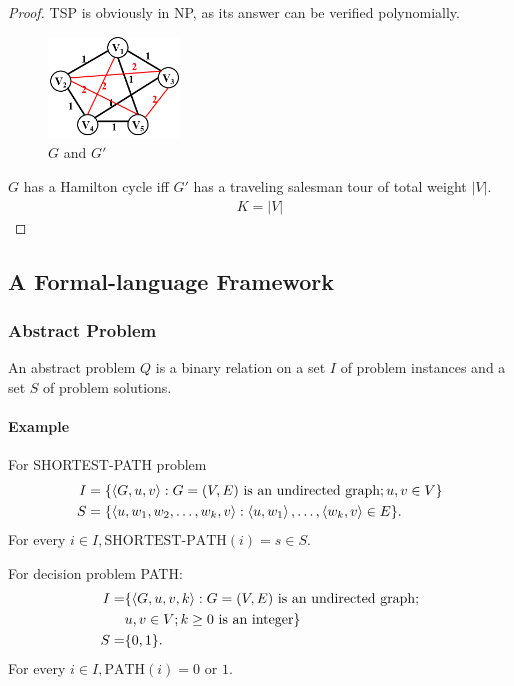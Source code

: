 \begin{proof}
    TSP is obviously in NP, as its answer can be verified polynomially. 
    \begin{figure}[!htb]
        \centering
        \includegraphics[width=0.309\textwidth]{pic/ADS10/TSP.png}
        \caption{$G$ and $G'$}
    \end{figure}
    
    $G$ has a Hamilton cycle iff $G'$ has a traveling salesman tour of total weight $|V|$.
    \begin{align*}
        K=|V|
    \end{align*}
\end{proof}

\subsection{A Formal-language Framework}

\subsubsection{Abstract Problem}
An abstract problem $Q$ is a binary relation on a set $I$ of problem instances and a set $S$ of problem solutions.

\paragraph{Example}
For SHORTEST-PATH problem
\begin{align*}
    I &= \{ \braket{G, u, v}: G=(V, E) \text{ is an undirected graph}; u, v \in V \}\\
    S &= \{ \braket{u, w_1, w_2, \dots, w_k, v}: \braket{u, w_1}, \dots, \braket{w_k, v} \in E \}.
\end{align*}
For every $i \in I, \text{SHORTEST-PATH}(i) = s \in S$.

For decision problem PATH:
\begin{align*}
    I =& \{ \braket{G, u, v, k}: G=(V, E) \text{ is an undirected graph}; \\
    & u, v \in V ;k\ge 0 \text{ is an integer}\}\\
    S =& \{0, 1\}.
\end{align*}
For every $i \in I, \text{PATH}(i) = 0 \text{ or }1$.

